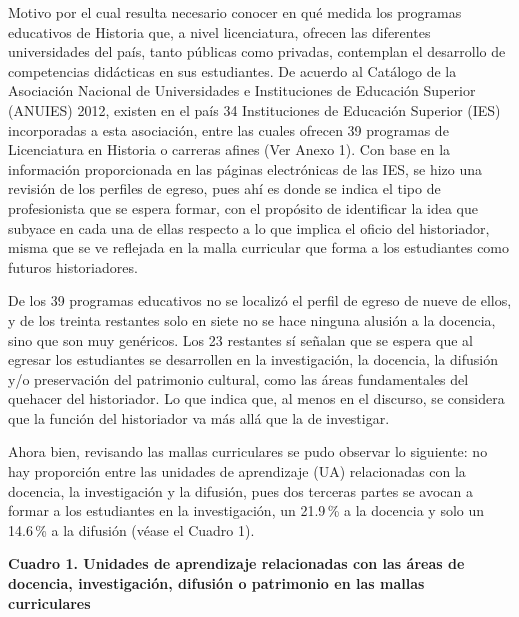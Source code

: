 \enlargethispage{1\baselineskip}
Motivo por el cual resulta necesario conocer en qué medida los 
programas educativos de Historia que, a nivel licenciatura, ofrecen las 
diferentes universidades del país, tanto públicas como privadas, 
contemplan el desarrollo de competencias didácticas en sus estudiantes. 
De acuerdo al Catálogo de la Asociación Nacional de Universidades e 
Instituciones de Educación Superior (ANUIES) 2012,  existen en el país 
34 Instituciones de Educación Superior (IES) incorporadas a esta 
asociación, entre las cuales ofrecen 39 programas de Licenciatura en Historia 
o carreras afines (Ver Anexo 1).  Con base en la información proporcionada en 
las páginas electrónicas de las IES, se hizo una revisión de los 
perfiles de egreso, pues ahí es donde se indica el tipo de 
profesionista que se espera formar, con el propósito de identificar la 
idea que subyace en cada una de ellas respecto a lo que implica el 
oficio del historiador,  misma que se ve reflejada en la malla 
curricular que forma a los estudiantes como futuros historiadores.

De los 39 programas educativos no se localizó el perfil de egreso de 
nueve de ellos, y de los treinta restantes solo en siete no se hace 
ninguna alusión a la docencia, sino que son muy genéricos.  Los 23 
restantes sí señalan que se espera que al egresar los estudiantes se 
desarrollen en la investigación, la docencia, la difusión y\slash{}o 
preservación del patrimonio cultural,  como las áreas fundamentales del 
quehacer del historiador. Lo que indica que, al menos en el discurso, se 
considera que la función del historiador va más allá que la de investigar.

\enlargethispage{1\baselineskip}
Ahora bien, revisando las mallas curriculares se pudo observar lo 
siguiente: no hay proporción entre las unidades de aprendizaje (UA) 
relacionadas con la docencia, la investigación y la difusión, pues dos 
terceras partes se avocan a formar a los estudiantes en la 
investigación, un 21.9\,\% a la docencia y solo un 14.6\,\% a la 
difusión (véase el Cuadro 1). 

\begin{small}
\textbf{Cuadro 1. Unidades de aprendizaje relacionadas con las áreas de 
docencia, investigación, difusión o patrimonio en las mallas 
curriculares} 
\end{small}

